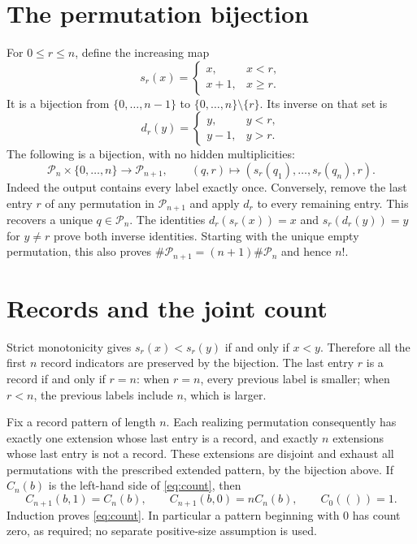 \documentclass[11pt]{article}
\begin{document}
\section{The permutation bijection}
For $0\leq r\leq n$, define the increasing map
\[
 s_r(x)=\begin{cases}x,&x<r,\\x+1,&x\geq r.\end{cases}
\]
It is a bijection from $\{0,\ldots,n-1\}$ to
$\{0,\ldots,n\}\setminus\{r\}$. Its inverse on that set is
\[
 d_r(y)=\begin{cases}y,&y<r,\\y-1,&y>r.\end{cases}
\]
The following is a bijection, with no hidden multiplicities:
\[
 \mathcal P_n\times\{0,\ldots,n\}\longrightarrow\mathcal P_{n+1},\qquad
 (q,r)\longmapsto (s_r(q_1),\ldots,s_r(q_n),r).
\]
Indeed the output contains every label exactly once. Conversely, remove
the last entry $r$ of any permutation in $\mathcal P_{n+1}$ and apply
$d_r$ to every remaining entry. This recovers a unique $q\in\mathcal P_n$.
The identities $d_r(s_r(x))=x$ and $s_r(d_r(y))=y$ for $y\ne r$
prove both inverse identities. Starting with the unique empty permutation,
this also proves $\#\mathcal P_{n+1}=(n+1)\#\mathcal P_n$ and hence $n!$.
\section{Records and the joint count}
Strict monotonicity gives
$s_r(x)<s_r(y)$ if and only if $x<y$. Therefore all the first $n$ record
indicators are preserved by the bijection. The last entry $r$ is a record
if and only if $r=n$: when $r=n$, every previous label is smaller; when
$r<n$, the previous labels include $n$, which is larger.

Fix a record pattern of length $n$. Each realizing permutation consequently
has exactly one extension whose last entry is a record, and exactly $n$
extensions whose last entry is not a record. These extensions are disjoint
and exhaust all permutations with the prescribed extended pattern, by the
bijection above. If $C_n(b)$ is the left-hand side of \eqref{eq:count}, then
\[
 C_{n+1}(b,1)=C_n(b),\qquad C_{n+1}(b,0)=nC_n(b),\qquad C_0(())=1.
\]
Induction proves \eqref{eq:count}. In particular a pattern beginning with
$0$ has count zero, as required; no separate positive-size assumption is used.
\end{document}
